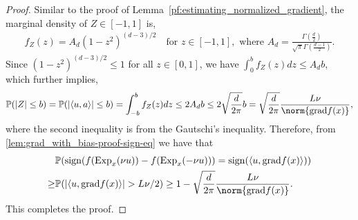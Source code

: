 \documentclass{article}
\newcommand{\rgrad}{\mathrm{grad}}
\newcommand{\pert}{\nu}
\DeclareMathOperator{\sign}{sign}
\theoremstyle{plain}
\theoremstyle{definition}
\theoremstyle{remark}
\begin{document}
\begin{proof}
Similar to the proof of Lemma~\ref{pf:estimating_normalized_gradient}, the marginal density of $ Z \in [-1,1] $ is,
\begin{align*}
    f_Z(z) = A_d (1 - z^2)^{(d - 3)/2} \quad \text{for } z \in [-1,1], \mbox{ where } A_d = \frac{\Gamma\left(\frac{d}{2}\right)}{\sqrt{\pi}  \Gamma\left(\frac{d-1}{2}\right)}.
\end{align*}
Since $ (1 - z^2)^{(d - 3)/2} \leq 1 $ for all $ z \in [0,1] $, we have $\int_0^b f_Z(z) dz \leq A_d  b$, which further implies,
\begin{align*}
\mathbb{P}(|Z| \leq b) = \mathbb{P}(|\langle u , a\rangle| \leq b)=\int_{-b}^b f_Z(z) dz \leq 2 A_d  b \leq 2\sqrt{\frac{d}{2\pi}} b = \sqrt{\frac{d}{2\pi}}\frac{{L}\pert}{\norm{\rgrad f(x)}}, 
\end{align*}
where the second inequality is from the Gautschi’s inequality. Therefore, from \eqref{lem:grad_with_bias-proof-sign-eq} we have that  
\begin{align*}
     & \mathbb{P}(\sign (f(\mathrm{Exp}_x(\pert u)) - f(\mathrm{Exp}_x(-\pert u)))= \sign (\langle u , \rgrad f(x)\rangle)) \\
     \geq &  \mathbb{P}(|\langle u, \mathrm{grad} f(x) \rangle| > L \nu/2)
    \geq  1-\sqrt{\frac{d}{2\pi}}\frac{{L}\pert}{\norm{\rgrad f(x)}}.
\end{align*}
This completes the proof. 
\end{proof}
\end{document}
